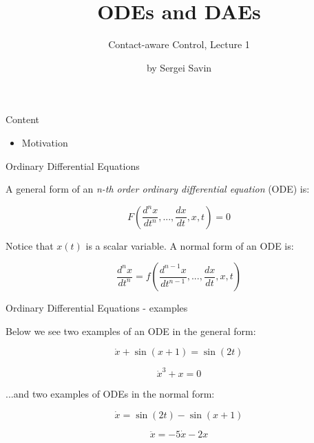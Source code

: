 \documentclass{beamer}
\title{ODEs and DAEs}
\subtitle{Contact-aware Control, Lecture 1}
\author{by Sergei Savin}
\date{\mydate}
\begin{document}
\maketitle


\begin{frame}{Content}

\begin{itemize}
\item Motivation
\end{itemize}

\end{frame}




\begin{frame}{Ordinary Differential Equations}
\begin{flushleft}

A general form of an \emph{n-th order ordinary differential equation} (ODE) is:

\begin{equation}
	F \left( \frac{d^n x}{dt^n}, ..., \frac{d x}{dt}, x, t  \right) = 0
\end{equation}

\bigskip

Notice that $x(t)$ is a scalar variable. A normal form of an ODE is:

\begin{equation}
	\frac{d^n x}{dt^n} = f \left( \frac{d^{n-1} x}{dt^{n-1}}, ..., \frac{d x}{dt}, x, t  \right)
\end{equation}

\end{flushleft}
\end{frame}




\begin{frame}{Ordinary Differential Equations - examples}
	\begin{flushleft}
		
		Below we see two examples of an ODE in the general form:
		
		\begin{equation}
			\dot x + \sin (x+1) = \sin(2t)
		\end{equation}
		
		\begin{equation}
			\dot x^3 + x = 0
		\end{equation}
	
	...and two examples of ODEs in the normal form:
		
		\begin{equation}
			\dot x = \sin(2t) - \sin (x+1) 
		\end{equation}
		
		\begin{equation}
			\ddot x = -5\dot x - 2 x
		\end{equation}
		
	\end{flushleft}
\end{frame}
\end{document}
